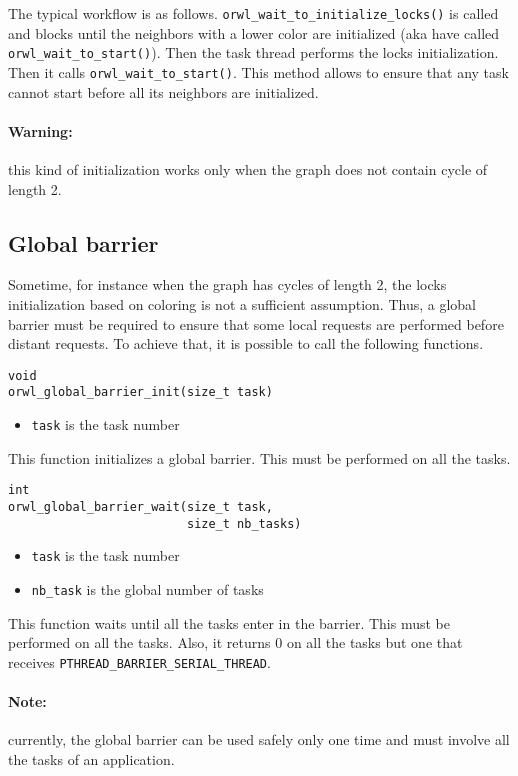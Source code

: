 \documentclass[10pt]{article}
\begin{document}
The typical workflow is as
follows. \texttt{orwl\_wait\_to\_initialize\_locks()} is called and
blocks until the neighbors with a lower color are initialized
(aka have called \texttt{orwl\_wait\_to\_start()}). Then the task
thread performs the locks initialization. Then it calls
\texttt{orwl\_wait\_to\_start()}. This method allows to ensure that
any task cannot start before all its neighbors are initialized.

\paragraph{Warning:}this kind of initialization works only when the
graph does not contain cycle of length 2.
 
\subsection{Global barrier}
Sometime, for instance when the graph has cycles of length 2, the
locks initialization based on coloring is not a sufficient
assumption. Thus, a global barrier must be required to ensure that
some local requests are performed before distant requests. To achieve
that, it is possible to call the following functions.
\begin{verbatim}
void
orwl_global_barrier_init(size_t task)
\end{verbatim}
\begin{itemize}
\item \texttt{task} is the task number 
\end{itemize}
This function initializes a global barrier. This must be performed on
all the tasks. 

\begin{verbatim}
int
orwl_global_barrier_wait(size_t task,
                         size_t nb_tasks)
\end{verbatim}
\begin{itemize}
\item \texttt{task} is the task number 
\item \texttt{nb\_task} is the global number of tasks
\end{itemize}
This function waits until all the tasks enter in the barrier. This
must be performed on all the tasks. Also, it returns 0 on all the
tasks but one that receives \texttt{PTHREAD\_BARRIER\_SERIAL\_THREAD}.

\paragraph{Note:}currently, the global barrier can be used safely only
one time and must involve all the tasks of an application. 
\end{document}
